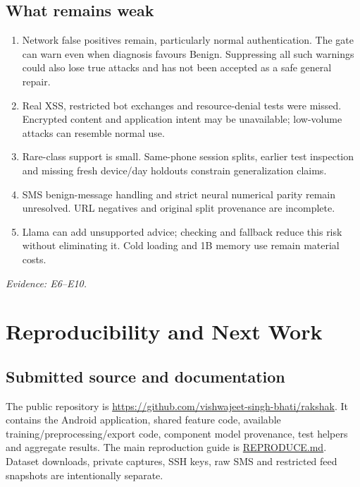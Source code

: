 \documentclass[11pt,a4paper]{article}
\newcommand{\source}[1]{{\small\textit{Evidence: #1.}\par}}
\newcommand{\chapterpage}[1]{\clearpage\section{#1}}
\newcommand{\repolink}[2]{\href{https://github.com/vishwajeet-singh-bhati/rakshak/blob/main/#1}{#2}}
\begin{document}
\subsection*{What remains weak}
\begin{enumerate}
\item Network false positives remain, particularly normal authentication. The gate can
warn even when diagnosis favours Benign. Suppressing all such warnings could also lose
true attacks and has not been accepted as a safe general repair.
\item Real XSS, restricted bot exchanges and resource-denial tests were missed. Encrypted
content and application intent may be unavailable; low-volume attacks can resemble normal use.
\item Rare-class support is small. Same-phone session splits, earlier test inspection and
missing fresh device/day holdouts constrain generalization claims.
\item SMS benign-message handling and strict neural numerical parity remain unresolved.
URL negatives and original split provenance are incomplete.
\item Llama can add unsupported advice; checking and fallback reduce this risk without
eliminating it. Cold loading and 1B memory use remain material costs.
\end{enumerate}
\source{E6--E10}

\chapterpage{Reproducibility and Next Work}
\subsection*{Submitted source and documentation}
The public repository is \url{https://github.com/vishwajeet-singh-bhati/rakshak}. It contains the Android application, shared
feature code, available training/preprocessing/export code, component model provenance,
test helpers and aggregate results. The main reproduction guide is
\repolink{REPRODUCE.md}{REPRODUCE.md}. Dataset downloads, private captures, SSH keys,
raw SMS and restricted feed snapshots are intentionally separate.
\end{document}
